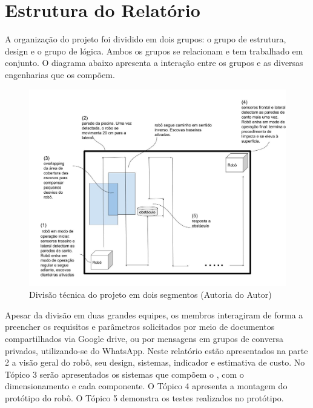 \section{Estrutura do Relatório}
A organização do projeto foi dividido em dois grupos: o grupo de estrutura,
design e o grupo de lógica. Ambos os grupos se relacionam e tem trabalhado em
conjunto. O diagrama abaixo apresenta a interação entre os grupos e as diversas
engenharias que os compõem.
\par
\begin{figure}[h]
    \centering
    \includegraphics[width=\textwidth]{figures/schema-way-robot.jpg}
    \caption{Divisão técnica do projeto em dois segmentos (\textsf{Autoria do Autor})}
    \label{fig:technical-div-project}
  \end{figure}
\par
Apesar da divisão em duas grandes equipes, os membros interagiram de forma a
preencher os requisitos e parâmetros solicitados por meio de documentos compartilhados
via Google drive, ou por mensagens em grupos de conversa privados, utilizando-se do
WhatsApp.
Neste relatório estão apresentados na parte 2 a visão geral do robô, seu design,
sistemas, indicador e estimativa de custo. No Tópico 3 serão apresentados os sistemas
que compõem o \cpr, com o dimensionamento e cada componente. O Tópico 4
apresenta a montagem do protótipo do robô. O Tópico 5 demonstra os testes realizados
no protótipo.